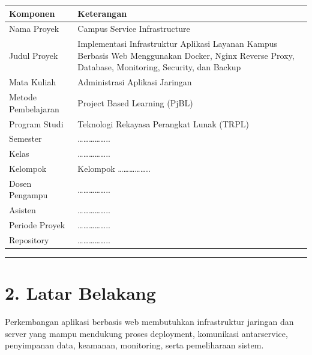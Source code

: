 \documentclass[
]{article}
\begin{document}
\begin{longtable}[]{@{}
  >{\raggedright\arraybackslash}p{}
  >{\raggedright\arraybackslash}p{}@{}}
\toprule\noalign{}
\begin{minipage}[b]{\linewidth}\raggedright
Komponen
\end{minipage} & \begin{minipage}[b]{\linewidth}\raggedright
Keterangan
\end{minipage} \\
\midrule\noalign{}
\endhead
\bottomrule\noalign{}
\endlastfoot
Nama Proyek & Campus Service Infrastructure \\
Judul Proyek & Implementasi Infrastruktur Aplikasi Layanan Kampus
Berbasis Web Menggunakan Docker, Nginx Reverse Proxy, Database,
Monitoring, Security, dan Backup \\
Mata Kuliah & Administrasi Aplikasi Jaringan \\
Metode Pembelajaran & Project Based Learning (PjBL) \\
Program Studi & Teknologi Rekayasa Perangkat Lunak (TRPL) \\
Semester & \ldots\ldots\ldots\ldots\ldots.. \\
Kelas & \ldots\ldots\ldots\ldots\ldots.. \\
Kelompok & Kelompok \ldots\ldots\ldots\ldots\ldots.. \\
Dosen Pengampu & \ldots\ldots\ldots\ldots\ldots.. \\
Asisten & \ldots\ldots\ldots\ldots\ldots.. \\
Periode Proyek & \ldots\ldots\ldots\ldots\ldots.. \\
Repository & \ldots\ldots\ldots\ldots\ldots.. \\
\end{longtable}

\begin{center}\rule{0.5\linewidth}{0.5pt}\end{center}

\section{2. Latar Belakang}\label{latar-belakang}

Perkembangan aplikasi berbasis web membutuhkan infrastruktur jaringan
dan server yang mampu mendukung proses deployment, komunikasi
antarservice, penyimpanan data, keamanan, monitoring, serta pemeliharaan
sistem.
\end{document}
